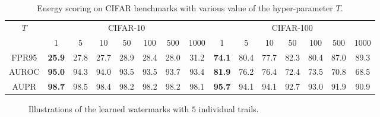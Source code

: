 \documentclass{article}
\begin{document}
\begin{table}[t]
\centering
\caption{{Energy scoring on CIFAR benchmarks with various value of the hyper-parameter $T$.}} \label{tab: energy t}
\scriptsize{
\begin{tabular}{c|ccccccc|ccccccc} 
\toprule[1.5pt]
\multirow{2}{*}{$T$} & \multicolumn{7}{c|}{CIFAR-10}                                   & \multicolumn{7}{c}{CIFAR-100}      \\
\cline{2-15}
                   & 1              & 5     & 10    & 50    & 100   & 500   & 1000  & 1 & 5 & 10 & 50 & 100 & 500 & 1000 \\
\midrule[1pt]
FPR95              & \textbf{25.9} & 27.8 & 27.7 & 28.9 & 28.4 & 28.0 & 31.2 & \textbf{74.1}  & 80.4 & 77.7 & 82.3 & 80.4 & 87.0 & 89.3 \\
AUROC              & \textbf{95.0} & 94.3 & 94.0 & 93.5 & 93.5 & 93.7 & 93.4 & \textbf{81.9}  & 76.2 & 76.4 & 72.4 & 73.5 & 70.8 & 68.5 \\
AUPR               & \textbf{98.7} & 98.5 & 98.4 & 98.2 & 98.2 & 98.2 & 98.1 & \textbf{95.7}  & 94.1 & 94.1 & 92.7 & 93.0 & 91.9 & 90.9 \\
\bottomrule[1.5pt]
\end{tabular}}
\end{table}

\begin{figure*}[!htp]
\centering  
{} 




\caption{Illustrations of the learned watermarks with $5$ individual trails.} \label{fig: f}
\end{figure*}
\end{document}
